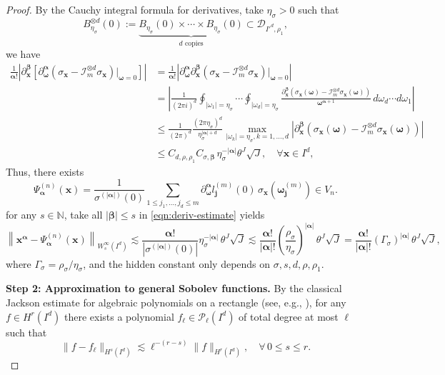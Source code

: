 \documentclass{article}
\numberwithin{equation}{section}
\def\NN{\mathbb{N}}
\def\lt{\left}
\def\rt{\right}
\def\bomega{{\bm\omega}}
\def\balpha{{\bm\alpha}}
\def\bbeta{{\bm\beta}}
\def\bx{{\bm x}}
\def\bj{{\bm j}}
\begin{document}
\begin{proof}
    By the Cauchy integral formula for derivatives, take $\eta_\sigma>0$ such that 
    $$ B_{\eta_\sigma}^{\otimes d}(0) := \underbrace{B_{\eta_\sigma}(0)\times\cdots\times B_{\eta_\sigma}(0)}_{d \text{ copies}}\subset \mathcal{D}_{I'^d,\rho_1},$$ we have 
    \begin{equation}\label{eqn:deriv-estimate}
        \begin{split}
            \frac{1}{\balpha!}\lt| \partial_\bx^\bbeta \lt[\partial_\bomega^\balpha(\sigma_\bx-\mathcal I_m^{\otimes d}\sigma_\bx)\bigg|_{\bomega=0}\rt] \rt| 
            &= \frac{1}{\balpha!}\lt| \partial_\bomega^\balpha\partial_\bx^\bbeta (\sigma_\bx-\mathcal I_m^{\otimes d}\sigma_\bx)\bigg|_{\bomega=0} \rt| \\
            &= \lt| \frac{1}{(2\pi i)^d}\oint_{|\omega_1|={\eta_\sigma}}\cdots\oint_{|\omega_d|={\eta_\sigma}} \frac{\partial_\bx^\bbeta (\sigma_\bx(\bomega)-\mathcal I_m^{\otimes d} \sigma_\bx(\bomega))}{\bomega^{\balpha+1}}\,d\omega_d\cdots d\omega_1 \rt| \\
            &\leq \frac{1}{(2\pi)^d}\frac{(2\pi \eta_\sigma)^d}{\eta_\sigma^{|\balpha|+d}} \max_{|\omega_k|=\eta_\sigma, k=1,\ldots,d} |\partial_\bx^\bbeta(\sigma_\bx(\bomega)-\mathcal I_m^{\otimes d} \sigma_\bx(\bomega))| \\
            &\leq C_{d,\rho,\rho_1}C_{\sigma,\bbeta}\,\eta_\sigma^{-|\balpha|}\theta^J\sqrt J,\quad\forall \bx\in I^d,
        \end{split}
    \end{equation}
    Thus, there exists
    $$\Psi_\balpha^{(n)}(\bx) = \frac{1}{\sigma^{(|\balpha|)}(0)}\sum_{1\leq j_1,\ldots,j_d\leq m} \partial_\bomega^\balpha l_\bj^{(m)}(0) \, \sigma_\bx(\bomega_\bj^{(m)}) \in V_n.$$
    for any $s\in\NN$, take all $|\bbeta|\leq s$ in \eqref{eqn:deriv-estimate} yields
    \begin{equation}\label{eqn:approx-to-poly-1}
        \lt\|\bx^\balpha - \Psi_\balpha^{(n)}(\bx) \rt\|_{W_s^\infty(I^d)} \lesssim \frac{\balpha!}{|\sigma^{(|\balpha|)}(0)|} \eta_\sigma^{-|\balpha|}\,\theta^J \sqrt J
        \lesssim \frac{\balpha!}{|\balpha|!} (\frac{\rho_\sigma}{\eta_\sigma})^{|\balpha|}\,\theta^J \sqrt J = \frac{\balpha!}{|\balpha|!}(\Gamma_\sigma)^{|\balpha|}\,\theta^J \sqrt J,
    \end{equation}
    where $\Gamma_\sigma = {\rho_\sigma} / \eta_\sigma $, and the hidden constant only depends on $\sigma,s,d,\rho,\rho_1$.

    \textbf{Step 2: Approximation to general Sobolev functions.}
    By the classical Jackson estimate for algebraic polynomials on a rectangle (see, e.g., \cite{devore1993constructive}), for any $f\in H^r(I^d)$ there exists a polynomial $f_\ell\in \mathcal{P}_\ell(I^d)$ of total degree at most $\ell$ such that 
    \begin{equation}\label{eqn:poly-approx-1}
        \|f-f_\ell\|_{H^s(I^d)}\lesssim \ell^{-(r-s)}\|f\|_{H^r(I^d)},\quad\forall\, 0\leq s\leq r.
    \end{equation}
    

\end{proof}
\end{document}
